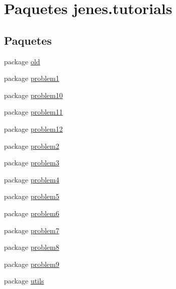\hypertarget{namespacejenes_1_1tutorials}{\section{Paquetes jenes.\-tutorials}
\label{namespacejenes_1_1tutorials}
}
\subsection*{Paquetes}
\begin{DoxyCompactItemize}
\item 
package \hyperlink{namespacejenes_1_1tutorials_1_1old}{old}
\item 
package \hyperlink{namespacejenes_1_1tutorials_1_1problem1}{problem1}
\item 
package \hyperlink{namespacejenes_1_1tutorials_1_1problem10}{problem10}
\item 
package \hyperlink{namespacejenes_1_1tutorials_1_1problem11}{problem11}
\item 
package \hyperlink{namespacejenes_1_1tutorials_1_1problem12}{problem12}
\item 
package \hyperlink{namespacejenes_1_1tutorials_1_1problem2}{problem2}
\item 
package \hyperlink{namespacejenes_1_1tutorials_1_1problem3}{problem3}
\item 
package \hyperlink{namespacejenes_1_1tutorials_1_1problem4}{problem4}
\item 
package \hyperlink{namespacejenes_1_1tutorials_1_1problem5}{problem5}
\item 
package \hyperlink{namespacejenes_1_1tutorials_1_1problem6}{problem6}
\item 
package \hyperlink{namespacejenes_1_1tutorials_1_1problem7}{problem7}
\item 
package \hyperlink{namespacejenes_1_1tutorials_1_1problem8}{problem8}
\item 
package \hyperlink{namespacejenes_1_1tutorials_1_1problem9}{problem9}
\item 
package \hyperlink{namespacejenes_1_1tutorials_1_1utils}{utils}
\end{DoxyCompactItemize}
